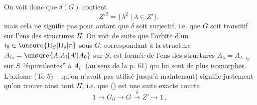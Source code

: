 

On voit donc que $\delta(G)$ contient 
\[
Z'^{2}=\{\lambda^2\mid\lambda\in Z'\},
\]
mais cela ne signifie pas pour autant que $\delta$ soit surjectif, i.e. que $G$ soit transitif sur l'ens des structures $\Pi$. On voit de suite que l'orbite d'un $i_0\in\unsure{\Pi_S|\Pi_s|\pi}$ sous $G$, correspondant à la structure $A_{i_0}=\unsure{A|A_i|A'|A_0}$ sur $S$, est formée de l'ens des structures $A_\lambda=A_{\lambda\cdot i_0}$ sur $S$ ``équivalentes'' à $A_{i_0}$ (au sens de la p. 61) qui lui sont de plus \uline{isomorphes}. L'axiome (To 5) -- qu'on n'avait pas utilisé jusqu'à maintenant) signifie justement qu'on trouve ainsi tout  $\Pi$, i.e. que () est une suite exacte courte
\[
1\longrightarrow G_0\longrightarrow G\xrightarrow{\delta}Z'\longrightarrow 1\,.\tag*{(63)}
\]

